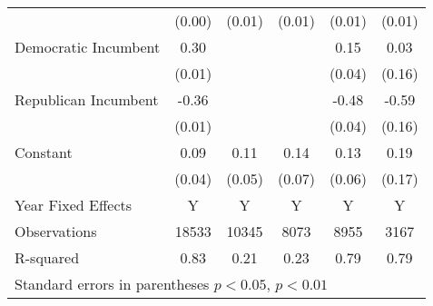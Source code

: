 \documentclass[12pt]{article}
\begin{document}
{\begin{tabular}{l|*{3}{c}|*{2}{c}}
			& (0.00)        & (0.01)        & (0.01)        & (0.01)        & (0.01)        \\
			\rule{0pt}{2ex}Democratic Incumbent      &   0.30\sym{**}&               &               &   0.15\sym{**}&   0.03        \\
			& (0.01)        &               &               & (0.04)        & (0.16)        \\
			\rule{0pt}{2ex}Republican Incumbent      &  -0.36\sym{**}&               &               &  -0.48\sym{**}&  -0.59\sym{**}\\
			& (0.01)        &               &               & (0.04)        & (0.16)        \\
			\rule{0pt}{2ex}Constant                  &   0.09\sym{*} &   0.11\sym{*} &   0.14        &   0.13\sym{*} &   0.19        \\
			& (0.04)        & (0.05)        & (0.07)        & (0.06)        & (0.17)        \\
			\hline             
			\rule{0pt}{4ex}Year Fixed Effects        &      Y        &      Y        &      Y        &      Y        &      Y        \\
			Observations              &  18533        &  10345        &   8073        &   8955        &   3167        \\
			R-squared                 &   0.83        &   0.21        &   0.23        &   0.79        &   0.79        \\
			\hline\hline
			\multicolumn{6}{l}{\footnotesize Standard errors in parentheses \sym{*} \(p<0.05\), \sym{**} \(p<0.01\)}\\
		\end{tabular}
	}
\end{document}
